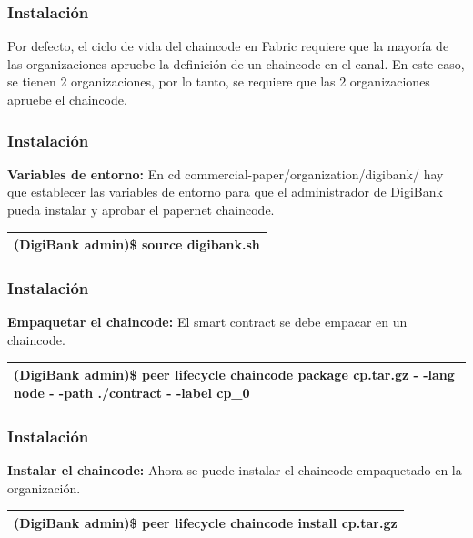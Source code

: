 \documentclass{beamer}
\begin{document}
	\begin{frame}
		\frametitle{Instalación}
		Por defecto, el ciclo de vida del chaincode en Fabric requiere que la mayoría de las organizaciones apruebe la definición de un chaincode en el canal. En este caso, se tienen 2 organizaciones, por lo tanto, se requiere que las 2 organizaciones apruebe el chaincode.
	\end{frame}
	
	\begin{frame}
		\frametitle{Instalación}
		\textbf{Variables de entorno:} En cd commercial-paper/organization/digibank/ hay que establecer las variables de entorno para que el administrador de DigiBank pueda instalar y aprobar el papernet chaincode.\\
		\begin{center}
			\begin{tabulary}{\linewidth}{L}
				\hline
				(DigiBank admin)\$ source digibank.sh\\
				\hline
			\end{tabulary} 
		\end{center}
	\end{frame}
	
	\begin{frame}
		\frametitle{Instalación}
		\textbf{Empaquetar el chaincode:} El smart contract se debe empacar en un chaincode.\\
		\begin{center}
			\begin{tabulary}{\linewidth}{L}
				\hline
				(DigiBank admin)\$ peer lifecycle chaincode package cp.tar.gz - -lang node - -path ./contract - -label cp\_0\\
				\hline
			\end{tabulary} 
		\end{center}
	\end{frame}
	
	\begin{frame}
		\frametitle{Instalación}
		\textbf{Instalar el chaincode:} Ahora se puede instalar el chaincode empaquetado en la organización.\\
		\begin{center}
			\begin{tabulary}{\linewidth}{L}
				\hline
				(DigiBank admin)\$ peer lifecycle chaincode install cp.tar.gz\\
				\hline
			\end{tabulary} 
		\end{center}
	\end{frame}
	
\end{document}
